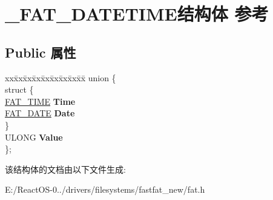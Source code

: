 \hypertarget{struct___f_a_t___d_a_t_e_t_i_m_e}{}\section{\+\_\+\+F\+A\+T\+\_\+\+D\+A\+T\+E\+T\+I\+M\+E结构体 参考}
\label{struct___f_a_t___d_a_t_e_t_i_m_e}
\subsection*{Public 属性}
\begin{DoxyCompactItemize}
\item 
\mbox{\label{struct___f_a_t___d_a_t_e_t_i_m_e_a80112f7bdcc93ac1ba81bd1398156594}} 
\begin{tabbing}
xx\=xx\=xx\=xx\=xx\=xx\=xx\=xx\=xx\=\kill
union \{\\
\mbox{\label{union___f_a_t___d_a_t_e_t_i_m_e_1_1_0D646_a2c6b35073ace68688a0275414f7e0940}} 
\>struct \{\\
\>\>\hyperlink{struct___f_a_t___t_i_m_e}{FAT\_TIME} {\bfseries Time}\\
\>\>\hyperlink{struct___f_a_t___d_a_t_e}{FAT\_DATE} {\bfseries Date}\\
\>\} \\
\>ULONG {\bfseries Value}\\
\}; \\

\end{tabbing}\end{DoxyCompactItemize}


该结构体的文档由以下文件生成\+:\begin{DoxyCompactItemize}
\item 
E\+:/\+React\+O\+S-\/0../drivers/filesystems/fastfat\+\_\+new/fat.\+h\end{DoxyCompactItemize}
